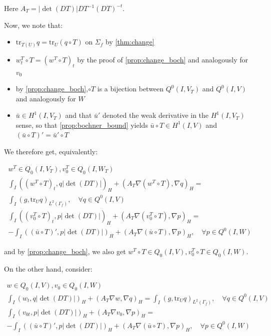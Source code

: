 \documentclass[english,a4paper,10pt,oneside]{scrbook}	%
\theoremstyle{break}
\theoremstyle{remark}
\newcommand{\tr}{\text{tr}}
\newcommand{\tred}[1]{\textcolor{red}{#1}}
\begin{document}
Here $A_T = |\det(DT)|DT^{-1}(DT)^{-t}$.

Now, we note that:

\begin{itemize}
	\item $\tr_{T(U)} q = \tr_U(q\circ T)$ on $\Sigma_f$ by \cref{thm:change}
	\item $w_t^T\circ T = (w^T\circ T)_t$ by the proof of \cref{prop:change_boch} and analogously for $v_0$
	\item by \cref{prop:change_boch},$\circ T$ is a bijection between $Q^0(I,V_T)$ and $Q^0(I,V)$ and analogously for $W$
	\item $\bar{u} \in H^1(I,V_T)$ and that $\bar{u}'$ denoted the weak derivative in the $H^1(I,V_T)$ sense, so that \ref{prop:bochner_bound} yields $\bar{u}\circ T \in H^1(I,V)$ and $(\bar{u}\circ T )' = \bar{u}'\circ T $
\end{itemize}

We therefore get, equivalently:

\begin{align*}
w^T \in Q_0(I, V_T), v_0^T \in Q_0(I,W_T) \\
\int_I ( (w^T\circ T)_t , q |\det(DT)|)_H+ (A_T\nabla (w^T\circ T), \nabla q)_{H} =\\ \int_I(g,\tr_{U} q)_{L^2(\Gamma_f)}, \quad \forall q \in Q^0(I, V) \\
\int_I ( (v_0^T\circ T)_t,p |\det(DT)|)_H + (A_T \nabla (v_0^T\circ T), \nabla p)_{H}=\\ -\int_I((\bar{u}\circ T)',p|\det(DT)|)_{H}+(A_T \nabla (\bar{u} \circ T), \nabla p)_{H}, \quad \forall p \in Q^0(I, W)
\end{align*}

and by \cref{prop:change_boch}, we also get $w^T\circ T \in Q_0(I,V), v_0^T\circ T \in Q_0(I,W)$.


On the other hand, consider:

\begin{align*}
w \in Q_0(I, V), v_0 \in Q_0(I,W) \\
\int_I ( w_t , q |\det(DT)|)_H+ (A_T\nabla w, \nabla q)_{H} =\int_I(g,\tr_{U} q)_{L^2(\Gamma_f)}, \quad \forall q \in Q^0(I, V) \\
\int_I ( v_{0t},p |\det(DT)|)_H + (A_T \nabla v_0, \nabla p)_{H}=\\ -\int_I((\bar{u}\circ T)',p|\det(DT)|)_{H}+(A_T \nabla (\bar{u} \circ T), \nabla p)_{H}, \quad \forall p \in Q^0(I, W)
\end{align*}
\end{document}
